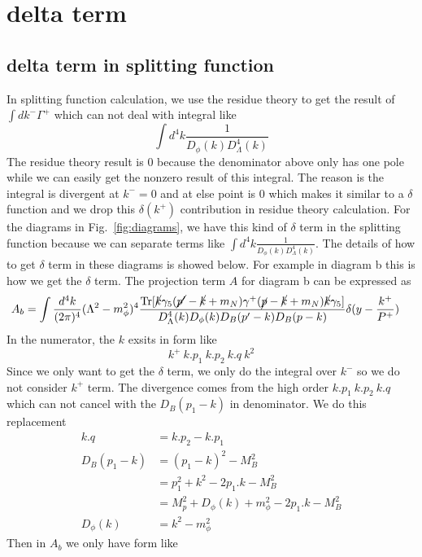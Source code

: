 \documentclass[preprintnumbers,prd,superscriptaddress,preprint]{revtex4-1}
\begin{document}
	
	\section{delta term}
	\subsection{delta term in splitting function}
	In splitting function calculation, we use the residue theory to get the result of $\int dk^{-}\Gamma^{+}$ which can not deal with integral like
	\[
	\int d^{4}k\frac{1}{D_{\phi}(k)D_{\Lambda}^{4}(k)}
	\]
	The residue theory result is 0 because the denominator above only has one pole while we can easily get the nonzero result of this integral. The reason is the integral is divergent at $k^{-}=0$ and at else point is 0 which makes it similar to a $\delta$ function and we drop this $\delta(k^{+})$ contribution in residue theory calculation. 
	For the diagrams in Fig.~\ref{fig:diagrams}, we have this kind of  $\delta$ term in the splitting function because we can separate terms like $\int d^{4}k\frac{1}{D_{\phi}(k)D_{\Lambda}^{4}(k)}$. The details of how to get $\delta$ term in these diagrams is showed below.
	For example in diagram b this is how we get the $\delta$ term. The projection term $A$ for diagram b can be expressed as
	\begin{align*}
		A_{b} & =\text{\ensuremath{\int\frac{d^{4}k}{(2\pi)^{4}}(\Lambda^{2}-m_{\phi}^{2})^{4}\frac{\textrm{Tr}[\cancel{k}\gamma_{5}(\cancel{p'}-\cancel{k}+m_{N})\gamma^{+}(\cancel{p}-\cancel{k}+m_{N})\cancel{k}\gamma_{5}]}{D_{\Lambda}^{4}(k)D_{\phi}(k)D_{B}(p'-k)D_{B}(p-k)}}}\delta(y-\frac{k^{+}}{P^{+}})
	\end{align*}
	In the numerator, the $k$ exsits in form like
	\[k^{+}\ k.p_{1}\ k.p_{2}\ k.q\ k^{2}\]
	Since we only want to get the $\delta$ term, we only do the integral over $k^{-}$ so we do not consider $k^{+}$ term. The divergence comes from the high order $k.p_{1}\ k.p_{2}\ k.q$ which can not cancel with the $D_{B}(p_{1}-k)$ in denominator. We do this replacement
	\begin{align*}
		k.q & =k.p_{2}-k.p_{1}\\
		D_{B}(p_{1}-k) & =(p_{1}-k)^{2}-M_{B}^{2}\\
		& =p_{1}^{2}+k^{2}-2p_{1}.k-M_{B}^{2}\\
		& =M_{p}^{2}+D_{\phi}(k)+m_{\phi}^{2}-2p_{1}.k-M_{B}^{2}\\
		D_{\phi}(k) & =k^{2}-m_{\phi}^{2}
	\end{align*}
	Then in $A_{b}$ we only have form like 
\end{document}
